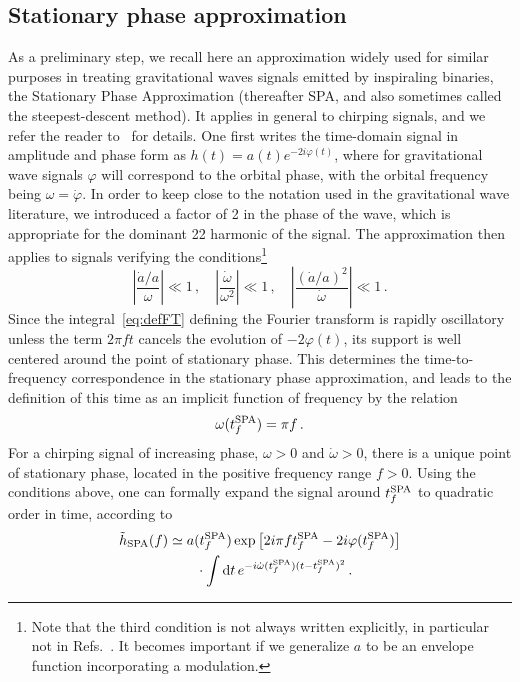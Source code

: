 \documentclass[aps,showpacs,twocolumn,
prd,superscriptaddress,nofootinbib]{revtex4-1}
\newcommand{\be}{\begin{equation}}
\newcommand{\ee}{\end{equation}}
\newcommand\ud{{\mathrm{d}}}
\newcommand{\nn}{\nonumber}
\newcommand{\tfSPA}{t_{f}^{\rm SPA}}
\begin{document}

\subsection{Stationary phase approximation}
\label{subsec:SPA}

As a preliminary step, we recall here an approximation widely used for similar purposes in treating gravitational waves signals emitted by inspiraling binaries, the Stationary Phase Approximation (thereafter SPA, and also sometimes called the steepest-descent method). It applies in general to chirping signals, and we refer the reader to~\cite{FC93, CF94} for details. One first writes the time-domain signal in amplitude and phase form as $h(t) = a(t) e^{-2i\varphi(t)}$, where for gravitational wave signals $\varphi$ will correspond to the orbital phase, with the orbital frequency being $\omega = \dot{\varphi}$. In order to keep close to the notation used in the gravitational wave literature, we introduced a factor of 2 in the phase of the wave, which is appropriate for the dominant 22 harmonic of the signal. The approximation then applies to signals verifying the conditions\footnote{Note that the third condition is not always written explicitly, in particular not in Refs.~\cite{FC93, CF94}. It becomes important if we generalize $a$ to be an envelope function incorporating a modulation.}
\be\label{eq:conditionsSPA}
	\left| \frac{\dot{a}/a}{\omega} \right| \ll 1\,, \quad \left|\frac{\dot{\omega}}{\omega^{2}} \right| \ll 1\,, \quad \left| \frac{(\dot{a}/a)^{2}}{\dot{\omega}} \right| \ll 1 \,.
\ee
Since the integral~\eqref{eq:defFT} defining the Fourier transform is rapidly oscillatory unless the term $2\pi f t$ cancels the evolution of $-2\varphi(t)$, its support is well centered around the point of stationary phase. This determines the time-to-frequency correspondence in the stationary phase approximation, and leads to the definition of this time as an implicit function of frequency by the relation
\be\label{eq:deftfSPA}
	\omega(\tfSPA) = \pi  f \,.
\ee
For a chirping signal of increasing phase, $\omega>0$ and $\dot{\omega}>0$, there is a unique point of stationary phase, located in the positive frequency range $f>0$. Using the conditions above, one can formally expand the signal around $\tfSPA$ to quadratic order in time, according to
\begin{align}
	\tilde{h}_{\rm SPA} (f) &\simeq a(\tfSPA) \exp\left[2i\pi f \tfSPA-2i\varphi(\tfSPA) \right] \nn\\
	& \qquad \cdot \int \ud t \, e^{-i \dot{\omega} (\tfSPA) (t-\tfSPA)^{2}} \,.
\end{align}
\end{document}
